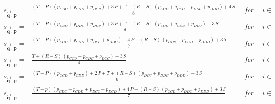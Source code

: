 \documentclass{article}
\theoremstyle{definition}
\begin{document}
\begin{equation*}
\begin{array}{lcll}
    s_{\mathbf{\tilde{q}}^{i}, \mathbf{p}} = & \frac{(T - P)\, (p_{CDC} + p_{CDD} + p_{DCD}) + 3\, P + T + (R - S)\, (p_{CCD} + p_{DCC} + p_{DDC} + p_{DDD}) + 4\,S}{8} &~~for~~ & i \in \\ [0.4cm]
    s_{\mathbf{\tilde{q}}^{i}, \mathbf{p}} = & \frac{(T - P)\, (p_{CDC} + p_{DDC} + p_{DCD}) + 3\, P + T + (R - S)\, (p_{CCD} + p_{CDD} + p_{DDC}) + 3\,S}{6} &~~for~~ & i \in \\ [0.4cm]
    s_{\mathbf{\tilde{q}}^{i}, \mathbf{p}} = & \frac{(T - P)\, (p_{CCD} + p_{CDD} + p_{DCC} + p_{DDC}) + 4\, P + (R - S)\, (p_{CDC} + p_{DCD} + p_{DDD}) + 3\,S}{7} &~~for~~ & i \in \\ [0.4cm]
    s_{\mathbf{\tilde{q}}^{i}, \mathbf{p}} = & \frac{T  + (R - S)\, (p_{CCD} + p_{CDC} + p_{DCC}) + 3\,S}{4} &~~for~~ & i \in \\ [0.4cm]
    s_{\mathbf{\tilde{q}}^{i}, \mathbf{p}} = & \frac{(T - P)\, (p_{CCD} + p_{CDD}) + 2\,P + T + (R - S)\, (p_{DCC} + p_{DDC} + p_{DDD}) + 3\,S}{6} &~~for~~ & i \in \\ [0.4cm]
    s_{\mathbf{\tilde{q}}^{i}, \mathbf{p}} = & \frac{(T - p)\, (p_{CDC} + p_{CDD} + p_{DCC} + p_{DCD}) + 4\,P + (R - S)\, (p_{CCD} + p_{DDC} + p_{DDD}) + 3\,S}{7} &~~for~~ & i \in
\end{array}
\end{equation*}
\end{document}
